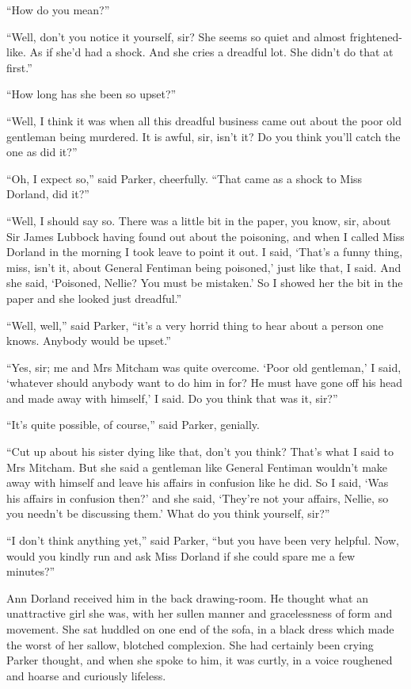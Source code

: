 \enquote{How do you mean?}

\enquote{Well, don't you notice it yourself, sir? She seems so quiet and almost frightened-like. As if she'd had a shock. And she cries a dreadful lot. She didn't do that at first.}

\enquote{How long has she been so upset?}

\enquote{Well, I think it was when all this dreadful business came out about the poor old gentleman being murdered. It is awful, sir, isn't it? Do you think you'll catch the one as did it?}

\enquote{Oh, I expect so,} said Parker, cheerfully. \enquote{That came as a shock to Miss Dorland, did it?}

\enquote{Well, I should say so. There was a little bit in the paper, you know, sir, about Sir James Lubbock having found out about the poisoning, and when I called Miss Dorland in the morning I took leave to point it out. I said, \enquote{That's a funny thing, miss, isn't it, about General Fentiman being poisoned,} just like that, I said. And she said, \enquote{Poisoned, Nellie? You must be mistaken.} So I showed her the bit in the paper and she looked just dreadful.}

\enquote{Well, well,} said Parker, \enquote{it's a very horrid thing to hear about a person one knows. Anybody would be upset.}

\enquote{Yes, sir; me and Mrs Mitcham was quite overcome. \enquote{Poor old gentleman,} I said, \enquote{whatever should anybody want to do him in for? He must have gone off his head and made away with himself,} I said. Do you think that was it, sir?}

\enquote{It's quite possible, of course,} said Parker, genially.

\enquote{Cut up about his sister dying like that, don't you think? That's what I said to Mrs Mitcham. But she said a gentleman like General Fentiman wouldn't make away with himself and leave his affairs in confusion like he did. So I said, \enquote{Was his affairs in confusion then?} and she said, \enquote{They're not your affairs, Nellie, so you needn't be discussing them.} What do you think yourself, sir?}

\enquote{I don't think anything yet,} said Parker, \enquote{but you have been very helpful. Now, would you kindly run and ask Miss Dorland if she could spare me a few minutes?}

Ann Dorland received him in the back drawing-room. He thought what an unattractive girl she was, with her sullen manner and gracelessness of form and movement. She sat huddled on one end of the sofa, in a black dress which made the worst of her sallow, blotched complexion. She had certainly been crying Parker thought, and when she spoke to him, it was curtly, in a voice roughened and hoarse and curiously lifeless.

